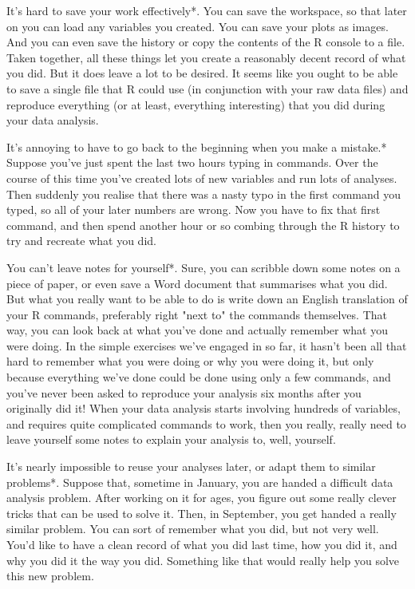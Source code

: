 \item *It's hard to save your work effectively*. You can save the workspace, so that later on you can load any variables you created.  You can save your plots as images. And you can even save the history or copy the contents of the R console to a file. Taken together, all these things let you create a reasonably decent record of what you did. But it does leave a lot to be desired. It seems like you ought to be able to save a single file that R could use (in conjunction with your raw data files) and reproduce everything (or at least, everything interesting) that you did during your data analysis.

\item *It's annoying to have to go back to the beginning when you make a mistake.* Suppose you've just spent the last two hours typing in commands. Over the course of this time you've created lots of new variables and run lots of analyses. Then suddenly you realise that there was a nasty typo in the first command you typed, so all of your later numbers are wrong. Now you have to fix that first command, and then spend another hour or so combing through the R history to try and recreate what you did.


\item *You can't leave notes for yourself*. Sure, you can scribble down some notes on a piece of paper, or even save a Word document that summarises what you did. But what you really want to be able to do is write down an English translation of your R commands, preferably right "next to" the commands themselves. That way, you can look back at what you've done and actually remember what you were doing. In the simple exercises we've engaged in so far, it hasn't been all that hard to remember what you were doing or why you were doing it, but only because everything we've done could be done using only a few commands, and you've never been asked to reproduce your analysis six months after you originally did it! When your data analysis starts involving hundreds of variables, and requires quite complicated commands to work, then you really, really need to leave yourself some notes to explain your analysis to, well, yourself. 

\item *It's nearly impossible to reuse your analyses later, or adapt them to similar problems*. Suppose that, sometime in January, you are handed a difficult data analysis problem. After working on it for ages, you figure out some really clever tricks that can be used to solve it. Then, in September, you get handed a really similar problem. You can sort of remember what you did, but not very well. You'd like to have a clean record of what you did last time, how you did it, and why you did it the way you did. Something like that would really help you solve this new problem.

